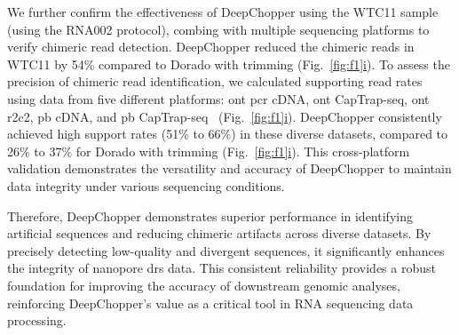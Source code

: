\documentclass[pdflatex, sn-mathphys-num, lineno]{sn-jnl}%
\newcommand{\figref}[2]{Fig.~\hyperref[#1]{\ref*{#1}#2}}
\theoremstyle{thmstyleone}%
\theoremstyle{thmstyletwo}%
\theoremstyle{thmstylethree}%
\begin{document}
We further confirm the effectiveness of DeepChopper using the WTC11 sample (using the RNA002 protocol), combing with multiple sequencing platforms to verify chimeric read detection.
DeepChopper reduced the chimeric reads in WTC11 by 54\% compared to Dorado with trimming (\figref{fig:f1}{i}).
To assess the precision of chimeric read identification, we calculated supporting read rates using data from five different platforms: \gls{ont} \gls{pcr} cDNA, \gls{ont} CapTrap-seq, \gls{ont} \gls{r2c2}, \gls{pb} cDNA, and \gls{pb} CapTrap-seq~\cite{carbonell2024captrap} (\figref{fig:f1}{i}).
DeepChopper consistently achieved high support rates (51\% to 66\%) in these diverse datasets, compared to 26\% to 37\% for Dorado with trimming (\figref{fig:f1}{i}).
This cross-platform validation demonstrates the versatility and accuracy of DeepChopper to maintain data integrity under various sequencing conditions.

Therefore, DeepChopper demonstrates superior performance in identifying artificial sequences and reducing chimeric artifacts across diverse datasets.
By precisely detecting low-quality and divergent sequences, it significantly enhances the integrity of nanopore \gls{drs} data. This consistent reliability provides a robust foundation for improving the accuracy of downstream genomic analyses, reinforcing DeepChopper's value as a critical tool in RNA sequencing data processing.
\end{document}
